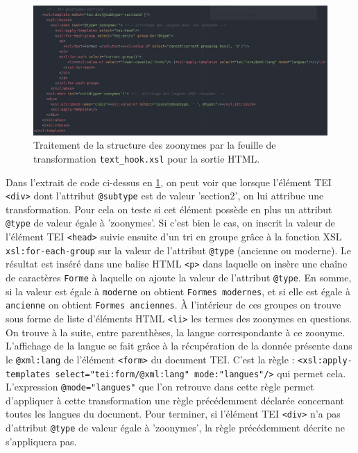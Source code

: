 \documentclass[a4paper,12pt,twoside]{book}
\begin{document}
\begin{figure}[H]
    \centering
    \includegraphics[width=\linewidth]{img/partie_2/zoonymes.JPG}
    \caption{Traitement de la structure des zoonymes par la feuille de transformation \texttt{text\_hook.xsl} pour la sortie \acrshort{HTML}.}
    \label{zoonymes}
\end{figure}

Dans l'extrait de code ci-dessus en \ref{zoonymes}, on peut voir que lorsque l'élément TEI \texttt{<div>} dont l'attribut \texttt{@subtype} est de valeur 'section2', on lui attribue une transformation. Pour cela on teste si cet élément possède en plus un attribut \texttt{@type} de valeur égale à 'zoonymes'. Si c'est bien le cas, on inscrit la valeur de l'élément TEI \texttt{<head>} suivie ensuite d'un tri en groupe grâce à la fonction \acrshort{XSL} \texttt{xsl:for-each-group} sur la valeur de l'attribut \texttt{@type} (\og ancienne\fg{} ou \og moderne\fg). Le résultat est inséré dans une balise \acrshort{HTML} \texttt{<p>} dans laquelle on insère une chaîne de caractères \texttt{Forme} à laquelle on ajoute la valeur de l'attribut \texttt{@type}. En somme, si la valeur est égale à \texttt{moderne} on obtient \texttt{Formes modernes}, et si elle est égale à \texttt{ancienne} on obtient \texttt{Formes anciennes}. À l'intérieur de ces groupes on trouve sous forme de liste d'éléments \acrshort{HTML} \texttt{<li>} les termes des zoonymes en questions. On trouve à la suite, entre parenthèses, la langue correspondante à ce zoonyme. L'affichage de la langue se fait grâce à la récupération de la donnée présente dans le \texttt{@xml:lang} de l'élément \texttt{<form>} du document TEI. C'est la règle : \texttt{<xsl:apply-templates select="tei:form/@xml:lang" mode:"langues"/>} qui permet cela. L'expression \texttt{@mode="langues"} que l'on retrouve dans cette règle permet d'appliquer à cette transformation une règle précédemment déclarée concernant toutes les langues du document. Pour terminer, si l'élément TEI \texttt{<div>} n'a pas d'attribut \texttt{@type} de valeur égale à 'zoonymes', la règle précédemment décrite ne s'appliquera pas.
\end{document}
